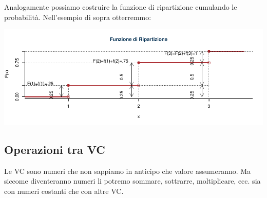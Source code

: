 \documentclass[
  11pt,
]{book}
\theoremstyle{mytheoremstyle}
\theoremstyle{mydefstyle}
\begin{document}
Analogamente possiamo costruire la funzione di ripartizione cumulando le probabilità.
Nell'esempio di sopra otterremmo:

\begin{center}\includegraphics{Appunti_di_Statistica_2025_files/figure-latex/06-Variabili-Casuali-2-1} \end{center}

\subsection{Operazioni tra VC}\label{operazioni-tra-vc}

Le VC sono numeri che non sappiamo in anticipo che valore assumeranno. Ma siccome
diventeranno numeri li potremo sommare, sottrarre, moltiplicare, ecc. sia con numeri
costanti che con altre VC.
\end{document}
